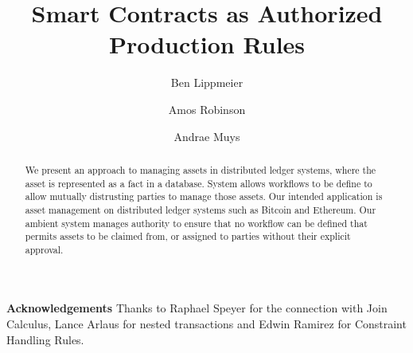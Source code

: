 \documentclass[format=sigconf, review=true, screen=true]{acmart}
\begin{document}

\title
{       Smart Contracts as Authorized Production Rules}



\author{Ben Lippmeier}

\author{Amos Robinson}

\author{Andrae Muys}

\begin{abstract}
We present an approach to managing assets in distributed ledger systems, where the asset is represented as a fact in a database. System allows workflows to be define to allow mutually distrusting parties to manage those assets. Our intended application is asset management on distributed ledger systems such as Bitcoin and Ethereum. Our ambient system manages authority to ensure that no workflow can be defined that permits assets to be claimed from, or assigned to parties without their explicit approval.
\end{abstract}

\maketitle
\makeatactive










\textbf{Acknowledgements}
Thanks to Raphael Speyer for the connection with Join Calculus, Lance Arlaus for nested transactions and Edwin Ramirez for Constraint Handling Rules.


\clearpage{}


\end{document}
